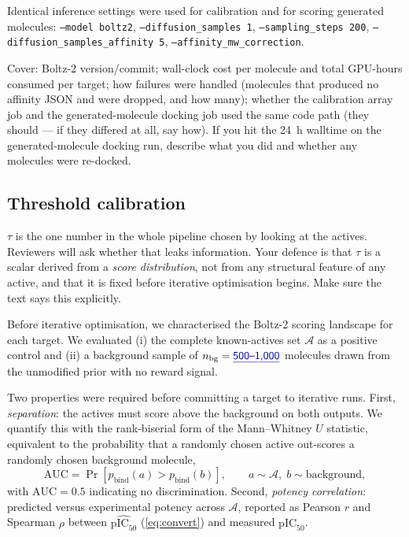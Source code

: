 \documentclass[11pt]{article}
\newcommand{\FILL}[1]{\textcolor{blue!65!black}{\underline{\textsf{#1}}}}
\newcommand{\pbind}{p_{\mathrm{bind}}}          %
\newcommand{\pICfifty}{\mathrm{pIC}_{50}}
\newcommand{\Actives}{\mathcal{A}}              %
\begin{document}
Identical inference settings were used for calibration and for scoring
generated molecules:
\texttt{--model boltz2},
\texttt{--diffusion\_samples 1},
\texttt{--sampling\_steps 200},
\texttt{--diffusion\_samples\_affinity 5},
\texttt{--affinity\_mw\_correction}.

\begin{yourturn}
Cover: Boltz-2 version/commit; wall-clock cost per molecule and total GPU-hours
consumed per target; how failures were handled (molecules that produced no
affinity JSON and were dropped, and how many); whether the calibration array
job and the generated-molecule docking job used the same code path (they should
--- if they differed at all, say how). If you hit the \SI{24}{\hour} walltime on
the generated-molecule docking run, describe what you did and whether any
molecules were re-docked.
\end{yourturn}

\subsection{Threshold calibration}
\label{sec:methods:calib}

\begin{guide}
$\tau$ is the one number in the whole pipeline chosen by looking at the actives.
Reviewers will ask whether that leaks information. Your defence is that $\tau$
is a scalar derived from a \emph{score distribution}, not from any structural
feature of any active, and that it is fixed before iterative optimisation
begins. Make sure the text says this explicitly.
\end{guide}

Before iterative optimisation, we characterised the Boltz-2 scoring landscape
for each target. We evaluated (i) the complete known-actives set $\Actives$ as a
positive control and (ii) a background sample of
$n_{\mathrm{bg}} = \FILL{500\text{--}1{,}000}$ molecules drawn from the
unmodified prior with no reward signal.

Two properties were required before committing a target to iterative runs.
First, \emph{separation}: the actives must score above the background on both
outputs. We quantify this with the rank-biserial form of the Mann--Whitney $U$
statistic, equivalent to the probability that a randomly chosen active
out-scores a randomly chosen background molecule,
\begin{equation}
  \mathrm{AUC}
  = \Pr\!\left[\pbind(a) > \pbind(b)\right],
  \qquad a \sim \Actives,\; b \sim \mathrm{background},
  \label{eq:auc}
\end{equation}
with $\mathrm{AUC} = 0.5$ indicating no discrimination. Second,
\emph{potency correlation}: predicted versus experimental potency across
$\Actives$, reported as Pearson $r$ and Spearman $\rho$ between
$\widehat{\pICfifty}$ (\cref{eq:convert}) and measured $\pICfifty$.
\end{document}

